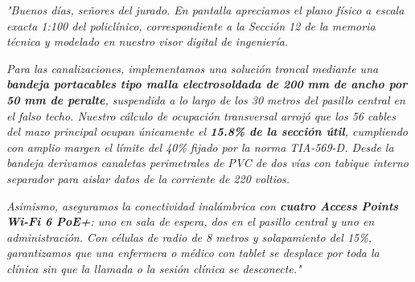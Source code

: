 \documentclass[11pt,a4paper]{article}
\begin{document}
\begin{tcolorbox}[colback=white,colframe=primaryblue,title=\textbf{Speech Verbal del Integrante 5 (Guion Palabra por Palabra)}]
\textit{"Buenos días, señores del jurado. En pantalla apreciamos el plano físico a escala exacta 1:100 del policlínico, correspondiente a la Sección 12 de la memoria técnica y modelado en nuestro visor digital de ingeniería.}\par\vspace{2mm}
\textit{Para las canalizaciones, implementamos una solución troncal mediante una \textbf{bandeja portacables tipo malla electrosoldada de 200 mm de ancho por 50 mm de peralte}, suspendida a lo largo de los 30 metros del pasillo central en el falso techo. Nuestro cálculo de ocupación transversal arrojó que los 56 cables del mazo principal ocupan únicamente el \textbf{15.8\% de la sección útil}, cumpliendo con amplio margen el límite del 40\% fijado por la norma TIA-569-D. Desde la bandeja derivamos canaletas perimetrales de PVC de dos vías con tabique interno separador para aislar datos de la corriente de 220 voltios.}\par\vspace{2mm}
\textit{Asimismo, aseguramos la conectividad inalámbrica con \textbf{cuatro Access Points Wi-Fi 6 PoE+}: uno en sala de espera, dos en el pasillo central y uno en administración. Con células de radio de 8 metros y solapamiento del 15\%, garantizamos que una enfermera o médico con tablet se desplace por toda la clínica sin que la llamada o la sesión clínica se desconecte."}
\end{tcolorbox}

\newpage

\end{document}
